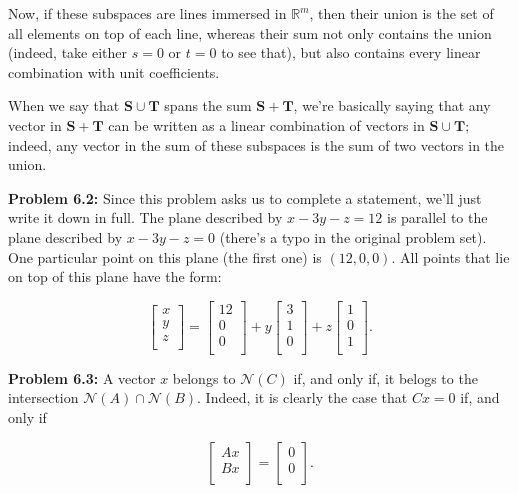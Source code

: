 \documentclass{article}
\begin{document}
Now, if these subspaces are lines immersed in $\mathbb{R}^{m}$, then their union is the set of all elements on top of each line, whereas their sum not only contains the union (indeed, take either $s = 0$ or $t = 0$ to see that), but also contains every linear combination with unit coefficients.

When we say that $\mathbf{S} \cup \mathbf{T}$ spans the sum $\mathbf{S + T}$, we're basically saying that any vector in $\mathbf{S + T}$ can be written as a linear combination of vectors in $\mathbf{S} \cup \mathbf{T}$; indeed, any vector in the sum of these subspaces is the sum of two vectors in the union.

\noindent \textbf{Problem 6.2:} Since this problem asks us to complete a statement, we'll just write it down in full. The plane described by $x - 3y - z = 12$ is parallel to the plane described by $x - 3y - z = 0$ (there's a typo in the original problem set). One particular point on this plane (the first one) is $(12, 0, 0)$. All points that lie on top of this plane have the form:

\[
\begin{bmatrix}
x\\
y\\
z\\
\end{bmatrix}
=
\begin{bmatrix}
12\\
0\\
0\\
\end{bmatrix}
+
y\begin{bmatrix}
3\\
1\\
0\\
\end{bmatrix}
+
z\begin{bmatrix}
1\\
0\\
1\\
\end{bmatrix}.
\]

\noindent \textbf{Problem 6.3:} A vector $x$ belongs to $\mathcal{N}(C)$ if, and only if, it belogs to the intersection $\mathcal{N}(A) \cap \mathcal{N}(B)$. Indeed, it is clearly the case that $Cx = 0$ if, and only if

\[
\begin{bmatrix}
Ax\\
Bx\\
\end{bmatrix}
=
\begin{bmatrix}
0\\
0\\
\end{bmatrix}.
\]
\end{document}
